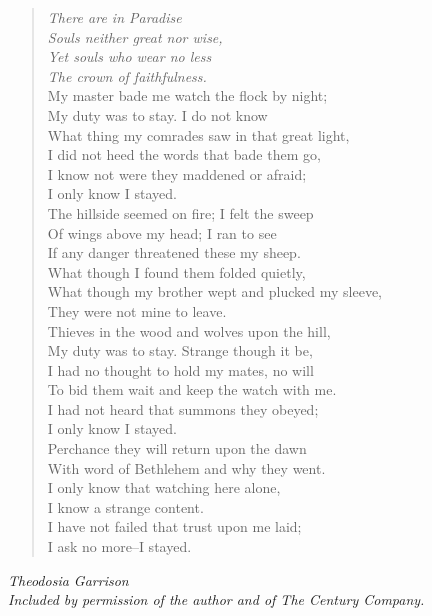 
\begin{verse}
\hspace*{4em}\textit{There are in Paradise}\\
\hspace*{4em}\textit{Souls neither great nor wise,}\\
\hspace*{4em}\textit{Yet souls who wear no less}\\
\hspace*{4em}\textit{The crown of faithfulness.}\\[0.7em]

My master bade me watch the flock by night;\\
My duty was to stay. I do not know\\
What thing my comrades saw in that great light,\\
I did not heed the words that bade them go,\\
I know not were they maddened or afraid;\\
\hspace*{2em}I only know I stayed.\\[0.7em]

The hillside seemed on fire; I felt the sweep\\
Of wings above my head; I ran to see\\
If any danger threatened these my sheep.\\
What though I found them folded quietly,\\
What though my brother wept and plucked my sleeve,\\
\hspace*{2em}They were not mine to leave.\\[0.7em]

Thieves in the wood and wolves upon the hill,\\
My duty was to stay. Strange though it be,\\
I had no thought to hold my mates, no will\\
To bid them wait and keep the watch with me.\\
I had not heard that summons they obeyed;\\
\hspace*{2em}I only know I stayed.\\[0.7em]

Perchance they will return upon the dawn\\
With word of Bethlehem and why they went.\\
I only know that watching here alone,\\
I know a strange content.\\
I have not failed that trust upon me laid;\\
\hspace*{2em}I ask no more--I stayed.%
\end{verse}

\vspace{0.5\baselineskip}
\noindent\textit{Theodosia Garrison}\\
\noindent\textit{Included by permission of the author and of The Century Company.}

\newpage
